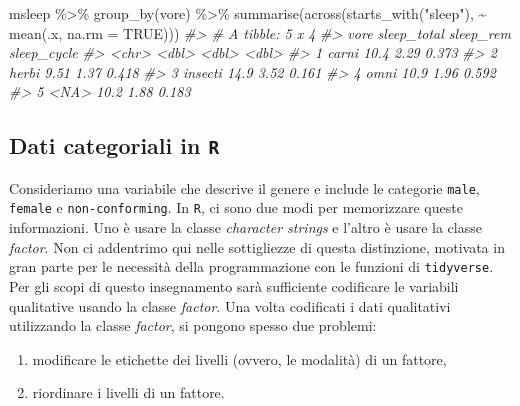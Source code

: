 \documentclass[
  11pt,
]{krantz}
\makeatletter
\newenvironment{Shaded}{\begin{snugshade}}{\end{snugshade}}
\newcommand{\AttributeTok}[1]{\textcolor[rgb]{0.61,0.61,0.61}{#1}}
\newcommand{\CommentTok}[1]{\textcolor[rgb]{0.37,0.37,0.37}{\textit{#1}}}
\newcommand{\ConstantTok}[1]{\textcolor[rgb]{0,0,0}{#1}}
\newcommand{\FunctionTok}[1]{\textcolor[rgb]{0,0,0}{#1}}
\newcommand{\NormalTok}[1]{#1}
\newcommand{\SpecialCharTok}[1]{\textcolor[rgb]{0,0,0}{#1}}
\newcommand{\StringTok}[1]{\textcolor[rgb]{0.5,0.5,0.5}{#1}}
\providecommand{\tightlist}{%
  \setlength{\itemsep}{0pt}\setlength{\parskip}{0pt}}
\newenvironment{kframe}{%
\medskip{}
\setlength{\fboxsep}{.8em}
 \def\at@end@of@kframe{}%
 \ifinner\ifhmode%
  \def\at@end@of@kframe{\end{minipage}}%
  \begin{minipage}{\columnwidth}%
 \fi\fi%
 \def\FrameCommand##1{\hskip\@totalleftmargin \hskip-\fboxsep
 \colorbox{shadecolor}{##1}\hskip-\fboxsep
     \hskip-\linewidth \hskip-\@totalleftmargin \hskip\columnwidth}%
 \MakeFramed {\advance\hsize-\width
   \@totalleftmargin\z@ \linewidth\hsize
   \@setminipage}}%
 {\par\unskip\endMakeFramed%
 \at@end@of@kframe}
\renewenvironment{Shaded}{\begin{kframe}}{\end{kframe}}
\theoremstyle{definition}
\theoremstyle{definition}
\theoremstyle{definition}
\theoremstyle{definition}
\theoremstyle{remark}
\makeatother
\begin{document}
\begin{Shaded}
\begin{Highlighting}[]
\NormalTok{msleep }\SpecialCharTok{\%\textgreater{}\%}
  \FunctionTok{group\_by}\NormalTok{(vore) }\SpecialCharTok{\%\textgreater{}\%}
  \FunctionTok{summarise}\NormalTok{(}\FunctionTok{across}\NormalTok{(}\FunctionTok{starts\_with}\NormalTok{(}\StringTok{"sleep"}\NormalTok{), }\SpecialCharTok{\textasciitilde{}} \FunctionTok{mean}\NormalTok{(.x, }\AttributeTok{na.rm =} \ConstantTok{TRUE}\NormalTok{)))}
\CommentTok{\#\textgreater{} \# A tibble: 5 x 4}
\CommentTok{\#\textgreater{}   vore    sleep\_total sleep\_rem sleep\_cycle}
\CommentTok{\#\textgreater{}   \textless{}chr\textgreater{}         \textless{}dbl\textgreater{}     \textless{}dbl\textgreater{}       \textless{}dbl\textgreater{}}
\CommentTok{\#\textgreater{} 1 carni         10.4       2.29       0.373}
\CommentTok{\#\textgreater{} 2 herbi          9.51      1.37       0.418}
\CommentTok{\#\textgreater{} 3 insecti       14.9       3.52       0.161}
\CommentTok{\#\textgreater{} 4 omni          10.9       1.96       0.592}
\CommentTok{\#\textgreater{} 5 \textless{}NA\textgreater{}          10.2       1.88       0.183}
\end{Highlighting}
\end{Shaded}

\hypertarget{dati-categoriali-in-r}{%
\subsection{\texorpdfstring{Dati categoriali in \texttt{R}}{Dati categoriali in R}}\label{dati-categoriali-in-r}}

Consideriamo una variabile che descrive il genere e include le categorie \texttt{male}, \texttt{female} e \texttt{non-conforming}. In \texttt{R}, ci sono due modi per memorizzare queste informazioni. Uno è usare la classe \emph{character strings} e l'altro è usare la classe \emph{factor}. Non ci addentrimo qui nelle sottigliezze di questa distinzione, motivata in gran parte per le necessità della programmazione con le funzioni di \texttt{tidyverse}. Per gli scopi di questo insegnamento sarà sufficiente codificare le variabili qualitative usando la classe \emph{factor}. Una volta codificati i dati qualitativi utilizzando la classe \emph{factor}, si pongono spesso due problemi:

\begin{enumerate}
\def\labelenumi{\arabic{enumi}.}
\tightlist
\item
  modificare le etichette dei livelli (ovvero, le modalità) di un fattore,
\item
  riordinare i livelli di un fattore.
\end{enumerate}
\end{document}
